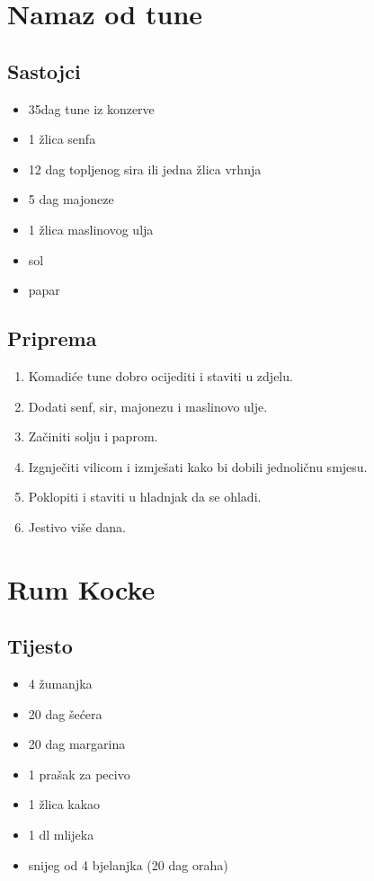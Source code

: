 \documentclass{article}
\begin{document}
\section{Namaz od tune}
\subsection{Sastojci}
\begin{itemize}
  \item 35dag tune iz konzerve
  \item 1 žlica senfa
  \item 12 dag topljenog sira ili jedna žlica vrhnja
  \item 5 dag majoneze
  \item 1 žlica maslinovog ulja
  \item sol
  \item papar
\end{itemize}

\subsection{Priprema}
\begin{enumerate}
  \item Komadiće tune dobro ocijediti i staviti u zdjelu.
  \item Dodati senf, sir, majonezu i maslinovo ulje.
  \item Začiniti solju i paprom.
  \item Izgnječiti vilicom i izmješati kako bi dobili jednoličnu smjesu.
  \item Poklopiti i staviti u hladnjak da se ohladi.
  \item Jestivo više dana.
\end{enumerate}

\section{Rum Kocke}
\subsection{Tijesto}
\begin{itemize}
  \item 4 žumanjka
  \item 20 dag šećera
  \item 20 dag margarina
  \item 1 prašak za pecivo
  \item 1 žlica kakao
  \item 1 dl mlijeka
  \item snijeg od 4 bjelanjka (20 dag oraha)
\end{itemize}
\end{document}
